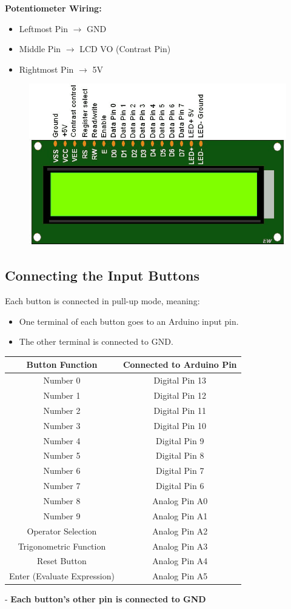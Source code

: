\documentclass[journal]{IEEEtran}
\begin{document}
\textbf{Potentiometer Wiring:}
\begin{itemize}
  \item Leftmost Pin $\rightarrow$ GND
  \item Middle Pin $\rightarrow$ LCD VO (Contrast Pin)
  \item Rightmost Pin $\rightarrow$ 5V
\end{itemize}
\begin{figure}[h!]
   \centering
   \includegraphics[width=0.50\columnwidth]{figs/LCD.png}
   \label{stemplot}
\end{figure}

\subsection{Connecting the Input Buttons }

Each button is connected in pull-up mode, meaning:
\begin{itemize}
  \item One terminal of each button goes to an Arduino input pin.
  \item The other terminal is connected to GND.
\end{itemize}

\begin{table}[H]
\centering
\begin{tabular}{|c|c|}
\hline
\textbf{Button Function} & \textbf{Connected to Arduino Pin} \\
\hline
Number 0 & Digital Pin 13 \\
Number 1 & Digital Pin 12 \\
Number 2 & Digital Pin 11 \\
Number 3 & Digital Pin 10 \\
Number 4 & Digital Pin 9 \\
Number 5 & Digital Pin 8 \\
Number 6 & Digital Pin 7 \\
Number 7 & Digital Pin 6 \\
Number 8 & Analog Pin A0 \\
Number 9 & Analog Pin A1 \\
Operator Selection & Analog Pin A2 \\
Trigonometric Function & Analog Pin A3 \\
Reset Button & Analog Pin A4 \\
Enter (Evaluate Expression) & Analog Pin A5 \\
\hline
\end{tabular}
\end{table}
- \textbf{Each button’s other pin is connected to GND}
\end{document}
